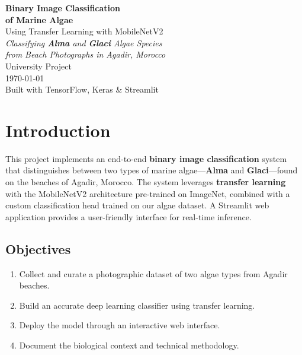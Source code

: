 \documentclass[12pt,a4paper]{article}
\begin{document}
\begin{titlepage}
    \centering
    \vspace*{2cm}
    {\Huge\bfseries Binary Image Classification\\of Marine Algae\\[0.5cm]}
    {\LARGE Using Transfer Learning with MobileNetV2\\[1.5cm]}
    {\Large\itshape Classifying \textbf{Alma} and \textbf{Glaci} Algae Species\\from Beach Photographs in Agadir, Morocco\\[2cm]}
    {\large University Project\\[0.5cm]}
    {\large\today\\[3cm]}
    \vfill
    {\normalsize Built with TensorFlow, Keras \& Streamlit}
\end{titlepage}

\newpage
\tableofcontents
\newpage

\section{Introduction}

This project implements an end-to-end \textbf{binary image classification} system that distinguishes between two types of marine algae---\textbf{Alma} and \textbf{Glaci}---found on the beaches of Agadir, Morocco. The system leverages \textbf{transfer learning} with the MobileNetV2 architecture pre-trained on ImageNet, combined with a custom classification head trained on our algae dataset. A Streamlit web application provides a user-friendly interface for real-time inference.

\subsection{Objectives}

\begin{enumerate}
    \item Collect and curate a photographic dataset of two algae types from Agadir beaches.
    \item Build an accurate deep learning classifier using transfer learning.
    \item Deploy the model through an interactive web interface.
    \item Document the biological context and technical methodology.
\end{enumerate}
\end{document}
